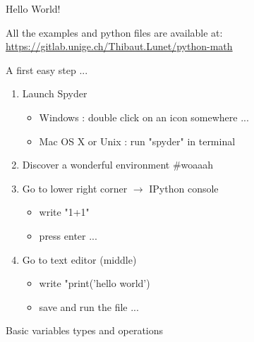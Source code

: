 \documentclass[11pt,unknownkeysallowed,usenames,dvipsnames]{beamer}
\begin{document}
	\begin{frame}{Hello World!}
        \begin{center}
            All the examples and python files are available at: \\
            \href{https://gitlab.unige.ch/Thibaut.Lunet/python-math}{https://gitlab.unige.ch/Thibaut.Lunet/python-math}
        \end{center}
        
        \begin{block}{A first easy step ...}
            \begin{enumerate}
                \item Launch Spyder
                \begin{itemize}
                    \item Windows : double click on an icon somewhere ...
                    \item Mac OS X or Unix : run "spyder" in terminal
                \end{itemize}
                \item Discover a wonderful environment \#woaaah
                \item Go to lower right corner $\rightarrow$ IPython console
                \begin{itemize}
                    \item write "1+1"
                    \item press enter ...
                \end{itemize}
                \item Go to text editor (middle)
                \begin{itemize}
                    \item write "print('hello world')
                    \item save and run the file ...
                \end{itemize}
            \end{enumerate}
        \end{block}
        
    \end{frame}
    
    
\begin{frame}{Basic variables types and operations}
    \pythonCode
\end{frame}
\end{document}
